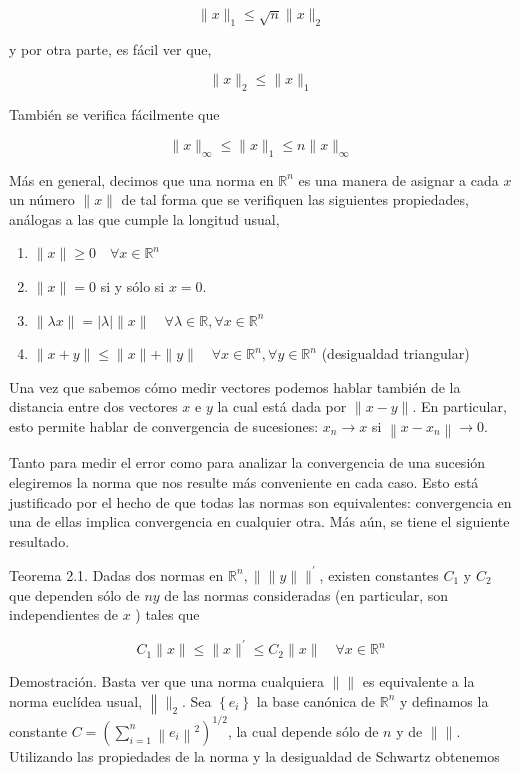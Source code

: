 \documentclass[10pt]{book}
\begin{document}
$$
\|x\|_{1} \leq \sqrt{n}\|x\|_{2}
$$

y por otra parte, es fácil ver que,

$$
\|x\|_{2} \leq\|x\|_{1}
$$

También se verifica fácilmente que

$$
\|x\|_{\infty} \leq\|x\|_{1} \leq n\|x\|_{\infty}
$$

Más en general, decimos que una norma en $\mathbb{R}^{n}$ es una manera de asignar a cada $x$ un número $\|x\|$ de tal forma que se verifiquen las siguientes propiedades, análogas a las que cumple la longitud usual,

\begin{enumerate}
  \item $\|x\| \geq 0 \quad \forall x \in \mathbb{R}^{n}$
  \item $\|x\|=0$ si y sólo si $x=0$.
  \item $\|\lambda x\|=|\lambda|\|x\| \quad \forall \lambda \in \mathbb{R}, \forall x \in \mathbb{R}^{n}$
  \item $\|x+y\| \leq\|x\|+\|y\| \quad \forall x \in \mathbb{R}^{n}, \forall y \in \mathbb{R}^{n}$ (desigualdad triangular)
\end{enumerate}

Una vez que sabemos cómo medir vectores podemos hablar también de la distancia entre dos vectores $x$ e $y$ la cual está dada por $\|x-y\|$. En particular, esto permite hablar de convergencia de sucesiones: $x_{n} \rightarrow x$ si $\left\|x-x_{n}\right\| \rightarrow 0$.

Tanto para medir el error como para analizar la convergencia de una sucesión elegiremos la norma que nos resulte más conveniente en cada caso. Esto está justificado por el hecho de que todas las normas son equivalentes: convergencia en una de ellas implica convergencia en cualquier otra. Más aún, se tiene el siguiente resultado.

Teorema 2.1. Dadas dos normas en $\mathbb{R}^{n},\| \| y\| \|^{\prime}$, existen constantes $C_{1}$ y $C_{2}$ que dependen sólo de $n y$ de las normas consideradas (en particular, son independientes de $x$ ) tales que

$$
C_{1}\|x\| \leq\|x\|^{\prime} \leq C_{2}\|x\| \quad \forall x \in \mathbb{R}^{n}
$$

Demostración. Basta ver que una norma cualquiera $\|\|$ es equivalente a la norma euclídea usual, $\left\|\|_{2}\right.$. Sea $\left\{e_{i}\right\}$ la base canónica de $\mathbb{R}^{n}$ y definamos la constante $C=\left(\sum_{i=1}^{n}\left\|e_{i}\right\|^{2}\right)^{1 / 2}$, la cual depende sólo de $n$ y de $\|\|$. Utilizando las propiedades de la norma y la desigualdad de Schwartz obtenemos
\end{document}
